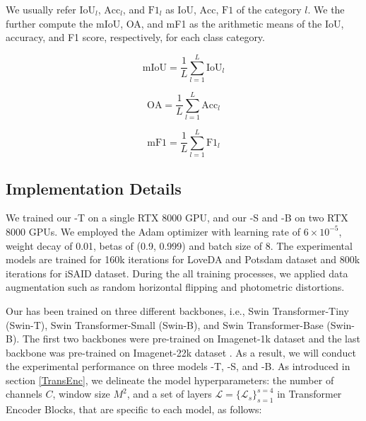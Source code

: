 \documentclass[journal]{IEEEtran}
\begin{document}
We usually refer $\text{IoU}_l$, $\text{Acc}_l$, and $\text{F1}_l$ as $\text{IoU}$, $\text{Acc}$, $\text{F1}$ of the category $l$.
We the further compute the mIoU, OA, and mF1 as the arithmetic means of the IoU, accuracy, and F1 score, respectively, for each class category.

\begin{equation}
    \text{mIoU} = \frac{1}{L} \sum_{l=1}^{L} \text{IoU}_l
\end{equation}

\begin{equation}
    \text{OA} = \frac{1}{L} \sum_{l=1}^{L} \text{Acc}_l
\end{equation}

\begin{equation}
    \text{mF1} = \frac{1}{L} \sum_{l=1}^{L} \text{F1}_l
\end{equation}


\subsection{Implementation Details}

We trained our \model-T on a single RTX 8000 GPU, and our \model-S and \model-B on two RTX 8000 GPUs. We employed the Adam \cite{kingma2014adam} optimizer with learning rate of $6\times10^{-5}$, weight decay of 0.01, betas of (0.9, 0.999) and batch size of $8$. The experimental models are trained for 160k iterations for LoveDA and Potsdam dataset and 800k iterations for iSAID dataset. During the all training processes, we applied data augmentation such as random horizontal flipping and photometric distortions.


Our \model has been trained on three different backbones, i.e., Swin Transformer-Tiny (Swin-T), Swin Transformer-Small (Swin-B), and Swin Transformer-Base (Swin-B). The first two backbones were pre-trained on Imagenet-1k dataset \cite{deng2009imagenet} and the last backbone was pre-trained on Imagenet-22k dataset \cite{deng2009imagenet}. As a result, we will conduct the experimental performance on three models \model-T, \model-S, and \model-B. As introduced in section \ref{TransEnc}, we delineate the model hyperparameters: 
the number of channels $C$,
window size $M^2$, and
a set of layers $\mathcal{L}= \{\mathcal{L}_s\}_{s=1}^{s=4}$ in Transformer Encoder Blocks, that are specific to each model, as follows:
\end{document}
